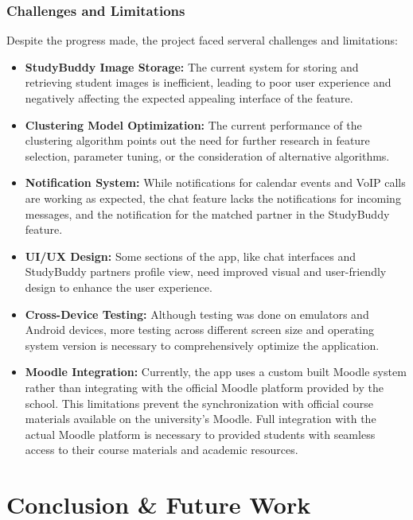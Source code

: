 \documentclass[12pt]{article}
\begin{document}
\subsubsection{Challenges and Limitations}
Despite the progress made, the project faced serveral challenges and limitations:
\begin{itemize}
    \item \textbf{StudyBuddy Image Storage: } The current system for storing and retrieving student images is inefficient, leading to poor user experience and negatively affecting the expected appealing interface of the feature.
    \item \textbf{Clustering Model Optimization: } The current performance of the clustering algorithm points out the need for further research in feature selection, parameter tuning, or the consideration of alternative algorithms.
    \item \textbf{Notification System: } While notifications for calendar events and VoIP calls are working as expected, the chat feature lacks the notifications for incoming messages, and the notification for the matched partner in the StudyBuddy feature. 
    \item \textbf{UI/UX Design: } Some sections of the app, like chat interfaces and StudyBuddy partners profile view, need improved visual and user-friendly design to enhance the user experience.
    \item \textbf{Cross-Device Testing: } Although testing was done on emulators and Android devices, more testing across different screen size and operating system version is necessary to comprehensively optimize the application.
    \item \textbf{Moodle Integration: } Currently, the app uses a custom built Moodle system rather than integrating with the official Moodle platform provided by the school. This limitations prevent the synchronization with official course materials available on the university's Moodle. Full integration with the actual Moodle platform is necessary to provided students with seamless access to their course materials and academic resources.
\end{itemize}

\section{Conclusion {\&} Future Work}\label{conclusion & future work}
\end{document}
